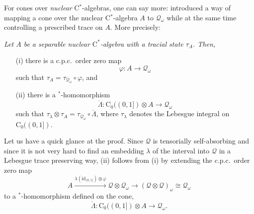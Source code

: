 \documentclass{amsart}
\newenvironment{nlemma}{\noindent {\sc Lemma:} \it}{}
\begin{document}
For cones over \emph{nuclear} C$^*$-algebras, one can say more: \cite[Lemma~2.6]{TWW} introduced a way of mapping a cone over the nuclear C$^*$-algebra $A$ to $\mathcal{Q}_\omega$ while at the same time controlling a prescribed trace on $A$. More precisely:

\begin{nlemma}
Let $A$ be a separable nuclear $\mathrm{C}^*$-algebra with a tracial state $\tau_A$. Then, 
\begin{enumerate}
\item[(i)]
there is a c.p.c.\ order zero map 
\[
\varphi:A \longrightarrow \mathcal{Q}_\omega
\]
such that $\tau_A = \tau_{\mathcal{Q}_\omega} \circ \varphi$,
and
\item[(ii)] there is a $^*$-homomorphism 
\[
\acute{\Lambda}: \mathrm{C}_0((0,1]) \otimes A \longrightarrow  \mathcal{Q}_\omega 
\]
such that $\tau_{\lambda} \otimes \tau_A = \tau_{\mathcal{Q}_\omega} \circ \acute{\Lambda}$, where $\tau_{\lambda}$ denotes the Lebesgue integral on $\mathrm{C}_0((0,1])$.
\end{enumerate}
\end{nlemma}

Let us have a quick glance at the proof. Since $\mathcal{Q}$ is tensorially self-absorbing and since it is not very hard to find an embedding $\lambda$ of the interval into $\mathcal{Q}$ in a Lebesgue trace preserving way, (ii) follows from (i) 
by extending the c.p.c.\ order zero map
\[
A \stackrel{\lambda(\mathrm{id}_{(0,1]}) \otimes \varphi}{\longrightarrow}  
\mathcal{Q} \otimes \mathcal{Q}_\omega \longrightarrow (\mathcal{Q} \otimes \mathcal{Q})_\omega \cong \mathcal{Q}_\omega
\]
to a $^*$-homomorphism defined on the cone,
\[
\acute{\Lambda}: \mathrm{C}_0((0,1]) \otimes A \longrightarrow  \mathcal{Q}_\omega. 
\]
\end{document}
